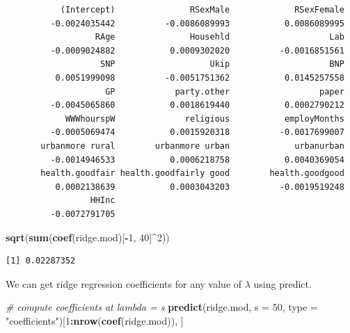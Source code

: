 \documentclass[]{article}
\newenvironment{Shaded}{\begin{snugshade}}{\end{snugshade}}
\newcommand{\CommentTok}[1]{\textcolor[rgb]{0.56,0.35,0.01}{\textit{#1}}}
\newcommand{\DataTypeTok}[1]{\textcolor[rgb]{0.13,0.29,0.53}{#1}}
\newcommand{\DecValTok}[1]{\textcolor[rgb]{0.00,0.00,0.81}{#1}}
\newcommand{\KeywordTok}[1]{\textcolor[rgb]{0.13,0.29,0.53}{\textbf{#1}}}
\newcommand{\NormalTok}[1]{#1}
\newcommand{\OperatorTok}[1]{\textcolor[rgb]{0.81,0.36,0.00}{\textbf{#1}}}
\newcommand{\StringTok}[1]{\textcolor[rgb]{0.31,0.60,0.02}{#1}}
\begin{document}
\begin{verbatim}
           (Intercept)               RSexMale             RSexFemale 
         -0.0024035442          -0.0086089993           0.0086089995 
                  RAge               Househld                    Lab 
         -0.0009024882           0.0009302020          -0.0016851561 
                   SNP                   Ukip                    BNP 
          0.0051999098          -0.0051751362           0.0145257558 
                    GP            party.other                  paper 
         -0.0045065860           0.0018619440           0.0002790212 
            WWWhourspW              religious           employMonths 
         -0.0005069474           0.0015920318          -0.0017699007 
       urbanmore rural        urbanmore urban             urbanurban 
         -0.0014946533           0.0006218758           0.0040369054 
       health.goodfair health.goodfairly good        health.goodgood 
          0.0002138639           0.0003043203          -0.0019519248 
                 HHInc 
         -0.0072791705 
\end{verbatim}

\begin{Shaded}
\begin{Highlighting}[]
\KeywordTok{sqrt}\NormalTok{(}\KeywordTok{sum}\NormalTok{(}\KeywordTok{coef}\NormalTok{(ridge.mod)[}\OperatorTok{-}\DecValTok{1}\NormalTok{, }\DecValTok{40}\NormalTok{]}\OperatorTok{^}\DecValTok{2}\NormalTok{))}
\end{Highlighting}
\end{Shaded}

\begin{verbatim}
[1] 0.02287352
\end{verbatim}

We can get ridge regression coefficients for any value of \(\lambda\) using predict.

\begin{Shaded}
\begin{Highlighting}[]
\CommentTok{# compute coefficients at lambda = s}
\KeywordTok{predict}\NormalTok{(ridge.mod, }\DataTypeTok{s =} \DecValTok{50}\NormalTok{, }\DataTypeTok{type =} \StringTok{"coefficients"}\NormalTok{)[}\DecValTok{1}\OperatorTok{:}\KeywordTok{nrow}\NormalTok{(}\KeywordTok{coef}\NormalTok{(ridge.mod)), ]}
\end{Highlighting}
\end{Shaded}
\end{document}
